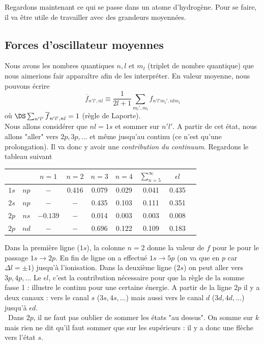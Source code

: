 Regardons maintenant ce qui se passe dans un atome d'hydrogène. Pour se faire, il va être utile de
travailler avec des grandeurs moyennées.

\subsection{Forces d'oscillateur moyennes}
Nous avons les nombres quantiques $n,l$ et $m_l$ (triplet de nombre quantique) que nous aimerions 
fair apparaître afin de les interpréter. En valeur moyenne, nous pouvons écrire
\begin{equation}
\overline{f}_{n'l',nl} \equiv \frac{1}{2l+1}
 \sum_{m_l',m_l} f_{n'l'm_l',nlm_l}
\end{equation}
où $\DS \sum_{n'l'} \overline{f}_{n'l',nl} = 1$ (règle de Laporte). \\

Nous allons considérer que $nl=1s$ et sommer sur $n'l'$. A partir de cet état, nous allons "aller" 
vers $2p, 3p,\dots$ et même jusqu'au continu (ce n'est qu'une prolongation). Il va donc y avoir
une \textit{contribution du continuum}. Regardons le tableau suivant
\begin{center}
\begin{tabular}{ccccccccc}
 & &  $n=1$ & $n=2$ & $n=3$ & $n=4$ 
& $\sum_{n=5}^\infty$ & $ \epsilon l$ \\
\hline
$1s$ & $np$ & $-$ & 0.416 & 0.079 & 0.029 &
0.041 & 0.435 \\
$2s$ & $np$ & $-$ & $-$   & 0.435 & 0.103 &
0.111 & 0.351 \\
$2p$ & $ns$ & $-0.139$ & $-$ & 0.014 & 0.003 &
0.003 & 0.008 \\
$2p$ & $nd$ & $-$ & $-$ & 0.696 & 0.122 & 0.109 &
0.183
\end{tabular}  
\end{center}
Dans la première ligne ($1s$), la colonne $n=2$ donne la valeur de $f$ pour le pour le passage 
$1s\to2p$. En fin de ligne on a effectué $1s\to 5p$ (on va que en $p$ car $\Delta l = \pm1$) jusqu'à
l'ionisation. Dans la deuxième ligne ($2s$) on peut aller vers $3p,4p,\dots$ Le $\epsilon l$, c'est la
contribution nécessaire pour que la règle de la somme fasse 1 : illustre le continu pour une certaine
énergie. A partir de la ligne $2p$ il y a deux canaux : vers le canal $s$ ($3s,4s,\dots$) mais aussi
vers le canal $d$ ($3d,4d,\dots$) jusqu'à $\epsilon d$.\\

\danger\ Dans $2p$, il ne faut pas oublier de sommer les états "au dessus". On somme sur $k$ mais
rien ne dit qu'il faut sommer que sur les supérieurs : il y a donc une flèche vers l'état $s$.\\

